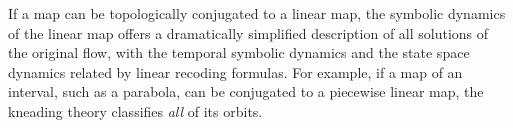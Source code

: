                                             \toCB %
If a map can be topologically conjugated to a linear map, the symbolic
dynamics of the linear map offers a dramatically simplified description
of all {\admissible} solutions of the original flow, with the temporal
symbolic dynamics and the state space dynamics related by linear recoding
formulas. For example, if a map of an interval, such as a parabola, can
be conjugated to a piecewise linear map, the kneading theory
classifies \emph{all} of its {\admissible} orbits.

\renewcommand{\statesp}{phase space}
\renewcommand{\Statesp}{Phase space}
\renewcommand{\stateDsp}{phase-space}
\renewcommand{\StateDsp}{Phase-space}


